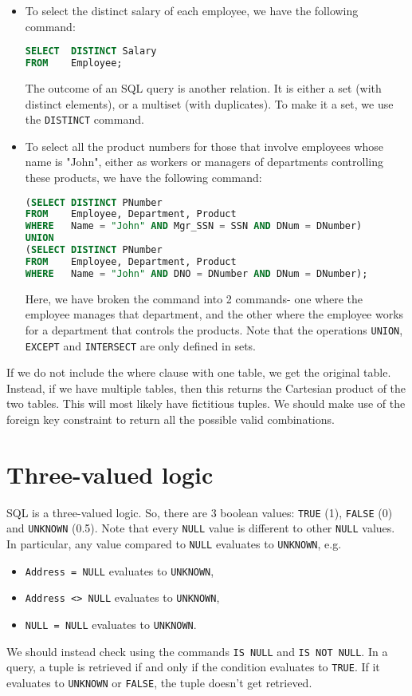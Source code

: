 \documentclass[a4paper, openany]{memoir}
\begin{document}
\begin{itemize}
    \item To select the distinct salary of each employee, we have the following command:
\begin{lstlisting}[language=SQL]
SELECT  DISTINCT Salary
FROM    Employee;
\end{lstlisting}
    The outcome of an SQL query is another relation. It is either a set (with distinct elements), or a multiset (with duplicates). To make it a set, we use the \texttt{DISTINCT} command.
    
    \item To select all the product numbers for those that involve employees whose name is "John", either as workers or managers of departments controlling these products, we have the following command:
\begin{lstlisting}[language=SQL]
(SELECT DISTINCT PNumber 
FROM    Employee, Department, Product
WHERE   Name = "John" AND Mgr_SSN = SSN AND DNum = DNumber) 
UNION
(SELECT DISTINCT PNumber 
FROM    Employee, Department, Product
WHERE   Name = "John" AND DNO = DNumber AND DNum = DNumber);
\end{lstlisting}
    Here, we have broken the command into 2 commands- one where the employee manages that department, and the other where the employee works for a department that controls the products. Note that the operations \texttt{UNION}, \texttt{EXCEPT} and \texttt{INTERSECT} are only defined in sets.
\end{itemize}

If we do not include the where clause with one table, we get the original table. Instead, if we have multiple tables, then this returns the Cartesian product of the two tables. This will most likely have fictitious tuples. We should make use of the foreign key constraint to return all the possible valid combinations.

\newpage

\section{Three-valued logic}
SQL is a three-valued logic. So, there are 3 boolean values: \texttt{TRUE} (1), \texttt{FALSE} (0) and \texttt{UNKNOWN} (0.5). Note that every \texttt{NULL} value is different to other \texttt{NULL} values. In particular, any value compared to \texttt{NULL} evaluates to \texttt{UNKNOWN}, e.g.
\begin{itemize}
    \item \texttt{Address = NULL} evaluates to \texttt{UNKNOWN},
    \item \texttt{Address <> NULL} evaluates to \texttt{UNKNOWN},
    \item \texttt{NULL = NULL} evaluates to \texttt{UNKNOWN}.
\end{itemize}
We should instead check using the commands \texttt{IS NULL} and \texttt{IS NOT NULL}. In a query, a tuple is retrieved if and only if the condition evaluates to \texttt{TRUE}. If it evaluates to \texttt{UNKNOWN} or \texttt{FALSE}, the tuple doesn't get retrieved.
\end{document}
